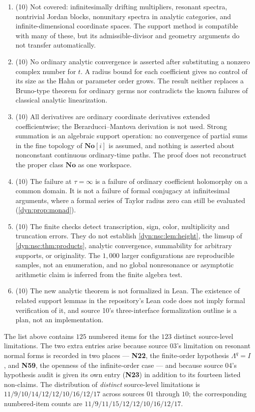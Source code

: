 \documentclass[11pt,letterpaper]{article}
\theoremstyle{definition}
\theoremstyle{remark}
\newcommand{\No}{\mathbf{No}}
\numberwithin{equation}{section}
\begin{document}
\begin{enumerate}[label=\textbf{N\arabic*.},ref=\textbf{N\arabic*},leftmargin=3.2em,start=109]
analytically outside its centered Taylor polydisk; the isotropic radius is
not a statement about maximal analytic continuation.
\item (10) Not covered: infinitesimally drifting multipliers, resonant
spectra, nontrivial Jordan blocks, nonunitary spectra in analytic
categories, and infinite-dimensional coordinate spaces. The support method
is compatible with many of these, but its admissible-divisor and geometry
arguments do not transfer automatically.
\item (10) No ordinary analytic convergence is asserted after substituting a
nonzero complex number for $t$. A radius bound for each coefficient gives no
control of its size as the Hahn or parameter order grows. The result neither
replaces a Bruno-type theorem for ordinary germs nor contradicts the known
failures of classical analytic linearization.
\item (10) All derivatives are ordinary coordinate derivatives extended
coefficientwise; the Berarducci--Mantova derivation is not used. Strong
summation is an algebraic support operation: no convergence of partial sums
in the fine topology of $\No[i]$ is assumed, and nothing is asserted about
nonconstant continuous ordinary-time paths. The proof does not reconstruct
the proper class $\No$ as one workspace.
\item (10) The failure at $\tau=\infty$ is a failure of ordinary coefficient
holomorphy on a common domain. It is not a failure of formal conjugacy at
infinitesimal arguments, where a formal series of Taylor radius zero can
still be evaluated (\cref{dyn:prop:monad}).
\item (10) The finite checks detect transcription, sign, color, multiplicity
and truncation errors. They do not establish \cref{dyn:nsc:lem:height}, the
limsup of \cref{dyn:nsc:thm:products}, analytic convergence, summability for
arbitrary supports, or originality. The $1{,}000$ larger configurations are
reproducible samples, not an enumeration, and no global nonresonance or
asymptotic arithmetic claim is inferred from the finite algebra test.
\item (10) The new analytic theorem is not formalized in Lean. The existence
of related support lemmas in the repository's Lean code does not imply
formal verification of it, and source 10's three-interface formalization
outline is a plan, not an implementation.
\end{enumerate}

\noindent The list above contains $125$ numbered items for the $123$ distinct
source-level limitations. The two extra entries arise because source 03's
limitation on resonant normal forms is recorded in two places ---
\textbf{N22}, the finite-order hypothesis $\Lambda^{q}=I$, and
\textbf{N59}, the openness of the infinite-order case --- and because
source 04's hypothesis audit is given its own entry
(\textbf{N23}) in addition to its fourteen listed non-claims. The
distribution of \emph{distinct} source-level limitations is
$11/9/10/14/12/12/10/16/12/17$ across sources $01$ through $10$; the
corresponding numbered-item counts are $11/9/11/15/12/12/10/16/12/17$.
\end{document}
